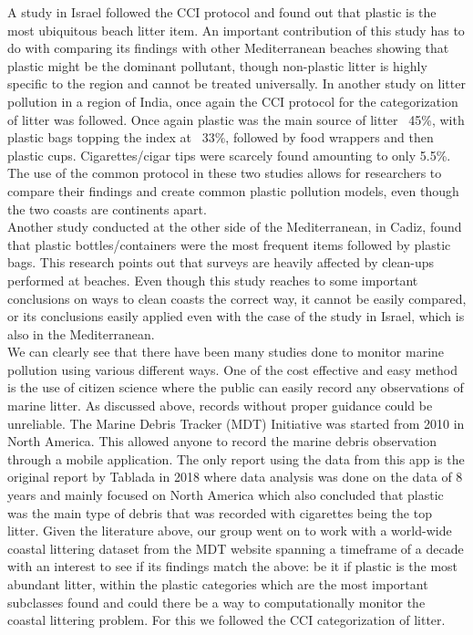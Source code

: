 \documentclass[10pt]{article}\usepackage[]{graphicx}\usepackage[]{color}
\begin{document}
A study in Israel followed the CCI protocol and found out that plastic is the most ubiquitous beach litter item.  An important contribution of this study has to do with comparing its findings with other Mediterranean beaches showing that plastic might be the dominant pollutant, though non-plastic litter is highly specific to the region and cannot be treated universally. \cite{PORTMAN2017} In another study on litter pollution in a region of India, once again the CCI protocol for the categorization of litter was followed. Once again plastic was the main source of litter ~45\%, with plastic bags topping the index at ~33\%, followed by food wrappers and then plastic cups. Cigarettes/cigar tips were scarcely found amounting to only 5.5\%. \cite{KUMAR2016} The use of the common protocol in these two studies allows for researchers to compare their findings and create common plastic pollution models, even though the two coasts are continents apart. \\

Another study conducted at the other side of the Mediterranean, in Cadiz, found that plastic bottles/containers were the most frequent items followed by plastic bags. This research points out that surveys are heavily affected by clean-ups performed at beaches. \cite{WILLIAMS2016} Even though this study reaches to some important conclusions on ways to clean coasts the correct way, it cannot be easily compared, or its conclusions easily applied even with the case of the study in Israel, which is also in the Mediterranean. \\

We can clearly see that there have been many studies done to monitor marine pollution using various different ways. One of the cost effective and easy method is the use of citizen science where the public can easily record any observations of marine litter. As discussed above, records without proper guidance could be unreliable. The Marine Debris Tracker (MDT) Initiative was started from 2010 in North America. This allowed anyone to record the marine debris observation through a mobile application. The only report using the data from this app is the original report by Tablada in 2018 \cite{JAMBECK2015B} where data analysis was done on the data of 8 years and mainly focused on North America which also concluded that plastic was the main type of debris that was recorded with cigarettes being the top litter. Given the literature above, our group went on to work with a world-wide coastal littering dataset  from the MDT website spanning a timeframe of a decade with an interest to see if its findings match the above: be it if plastic is the most abundant litter, within the plastic categories which are the most important subclasses found and could there be a way to computationally monitor the coastal littering problem. For this we followed the CCI categorization of litter. \\
\end{document}
